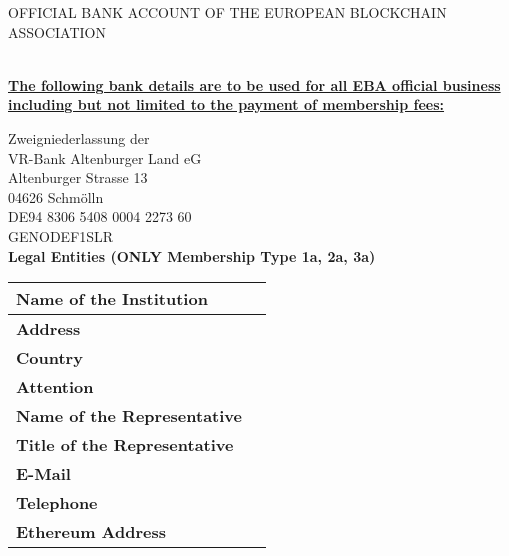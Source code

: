 \documentclass{article}
\begin{document}
\newpage

{\scshape\LARGE OFFICIAL BANK ACCOUNT OF THE EUROPEAN BLOCKCHAIN ASSOCIATION \centering \par}

\begin{center}
  \\
  \uline{\bfseries The following bank details are to be used for all EBA official business including but not limited to the payment of membership fees:}\\
\end{center}

Zweigniederlassung der\\
VR-Bank Altenburger Land eG\\
Altenburger Strasse 13\\
04626 Schmölln\\

DE94 8306 5408 0004 2273 60\\

GENODEF1SLR\\

\newpage
\textbf{Legal Entities (ONLY Membership Type 1a, 2a, 3a)}
\begin{longtable}{| p{} | p{} |}
	\hline
	\newline 
	\textbf{Name of the Institution} \newline & \\
	\hline	
	\newline 
	\textbf{Address} \newline & \\
	\hline	
	\newline 
	\textbf{Country} \newline & \\
	\hline	
	\newline 
	\textbf{Attention} \newline & \\
	\hline	
	\newline 
	\textbf{Name of the Representative} \newline & \\
	\hline	
	\newline 
	\textbf{Title of the Representative} \newline & \\
	\hline	
	\newline 
	\textbf{E-Mail} \newline & \\
	\hline	
	\newline 
	\textbf{Telephone} \newline & \\
	\hline	
	\newline 
	\textbf{Ethereum Address} \newline & \\
	\hline	
\end{longtable}
\vspace{1cm}
\end{document}
